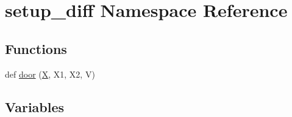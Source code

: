 \hypertarget{namespacesetup__diff}{}\section{setup\+\_\+diff Namespace Reference}
\label{namespacesetup__diff}
\subsection*{Functions}
\begin{DoxyCompactItemize}
\item 
def \hyperlink{namespacesetup__diff_a4c73aaba178aa74240a75b7a6a86e4c6}{door} (\hyperlink{namespacesetup__diff_ad01f7c1ee607d8a67926e30be25385f1}{X}, X1, X2, V)
\end{DoxyCompactItemize}
\subsection*{Variables}
